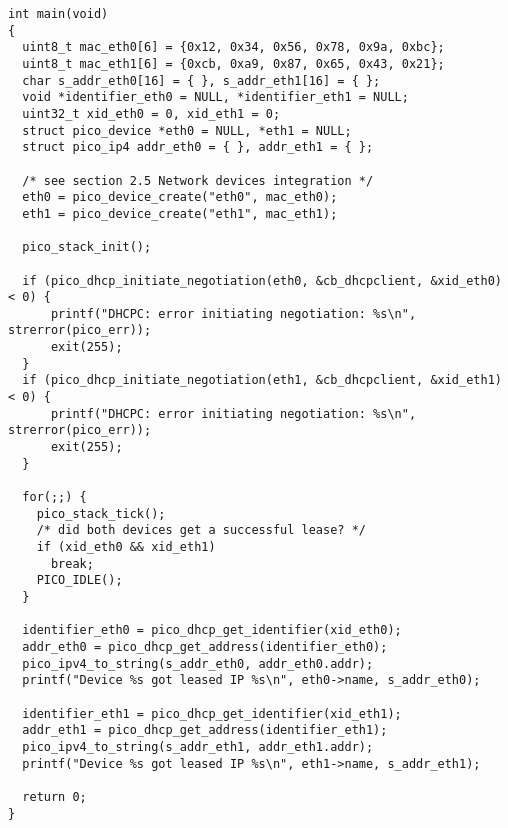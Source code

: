 \begin{verbatim}
int main(void)
{
  uint8_t mac_eth0[6] = {0x12, 0x34, 0x56, 0x78, 0x9a, 0xbc};
  uint8_t mac_eth1[6] = {0xcb, 0xa9, 0x87, 0x65, 0x43, 0x21};
  char s_addr_eth0[16] = { }, s_addr_eth1[16] = { };
  void *identifier_eth0 = NULL, *identifier_eth1 = NULL;
  uint32_t xid_eth0 = 0, xid_eth1 = 0;
  struct pico_device *eth0 = NULL, *eth1 = NULL;
  struct pico_ip4 addr_eth0 = { }, addr_eth1 = { };

  /* see section 2.5 Network devices integration */
  eth0 = pico_device_create("eth0", mac_eth0);
  eth1 = pico_device_create("eth1", mac_eth1);
  
  pico_stack_init();
  
  if (pico_dhcp_initiate_negotiation(eth0, &cb_dhcpclient, &xid_eth0) < 0) {
      printf("DHCPC: error initiating negotiation: %s\n", strerror(pico_err));
      exit(255);
  } 
  if (pico_dhcp_initiate_negotiation(eth1, &cb_dhcpclient, &xid_eth1) < 0) {
      printf("DHCPC: error initiating negotiation: %s\n", strerror(pico_err));
      exit(255);
  }
  
  for(;;) {
    pico_stack_tick();
    /* did both devices get a successful lease? */
    if (xid_eth0 && xid_eth1)
      break;
    PICO_IDLE();
  }
  
  identifier_eth0 = pico_dhcp_get_identifier(xid_eth0);
  addr_eth0 = pico_dhcp_get_address(identifier_eth0);
  pico_ipv4_to_string(s_addr_eth0, addr_eth0.addr);
  printf("Device %s got leased IP %s\n", eth0->name, s_addr_eth0);
  
  identifier_eth1 = pico_dhcp_get_identifier(xid_eth1);
  addr_eth1 = pico_dhcp_get_address(identifier_eth1);
  pico_ipv4_to_string(s_addr_eth1, addr_eth1.addr);
  printf("Device %s got leased IP %s\n", eth1->name, s_addr_eth1);
  
  return 0;
}
\end{verbatim}

